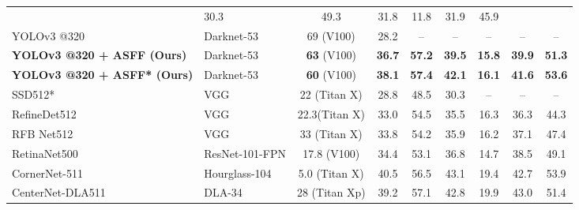 \documentclass[10pt,twocolumn,letterpaper]{article}
\begin{document}
\begin{table*}[htbp]
\begin{center}
{{\begin{threeparttable}
\begin{tabular}{l|l|c|ccc|ccc}
						& 30.3            & 49.3      & 31.8       & 11.8         & 31.9         & 45.9        \\
						YOLOv3 @320 \cite{yolov3}                  & Darknet-53                                     & 69 (V100)                                       & 28.2            & --        & --       & --         & --         & --        \\
						\textbf{YOLOv3 @320 + ASFF (Ours)}                   & Darknet-53                      & \textbf{63} (V100)                                       & \textbf{36.7}            & \textbf{57.2}        & \textbf{39.5}       & \textbf{15.8}        & \textbf{39.9}         & \textbf{51.3}       \\ 
						
						\textbf{YOLOv3 @320 + ASFF* (Ours)}                   & Darknet-53                      & \textbf{60} (V100)                                       & \textbf{38.1}            & \textbf{57.4}        & \textbf{42.1}       & \textbf{16.1}        & \textbf{41.6}         & \textbf{53.6}       \\ \hline
						SSD512* \cite{ssd}                 & VGG                                            & 22 (Titan X)                                      & 28.8            & 48.5       & 30.3       & --           & --           & --          \\
						RefineDet512\cite{refinedet}      & VGG                                           & 22.3(Titan X)
						& 33.0            & 54.5        & 35.5      & 16.3          & 36.3         &44.3          \\
						RFB Net512 \cite{RFB}              & VGG                                              & 33 (Titan X)                             & 33.8  & 54.2       & 35.9       & 16.2         & 37.1         & 47.4        \\
						RetinaNet500 \cite{focal-loss}            & ResNet-101-FPN                            & 17.8 (V100)                                      & 34.4            & 53.1       & 36.8       & 14.7         & 38.5         & 49.1        \\
						CornerNet-511 \cite{cornernet}     & Hourglass-104                                    & 5.0 (Titan X)
						& 40.5            &56.5        &43.1        &19.4          &42.7          &53.9         \\
						CenterNet-DLA511 \cite{objects}       & DLA-34                                           & 28 (Titan Xp)
						&39.2             &57.1        &42.8        &19.9          &43.0          &51.4         \\

\end{tabular}
\end{threeparttable}}}
\end{center}
\end{table*}
\end{document}
